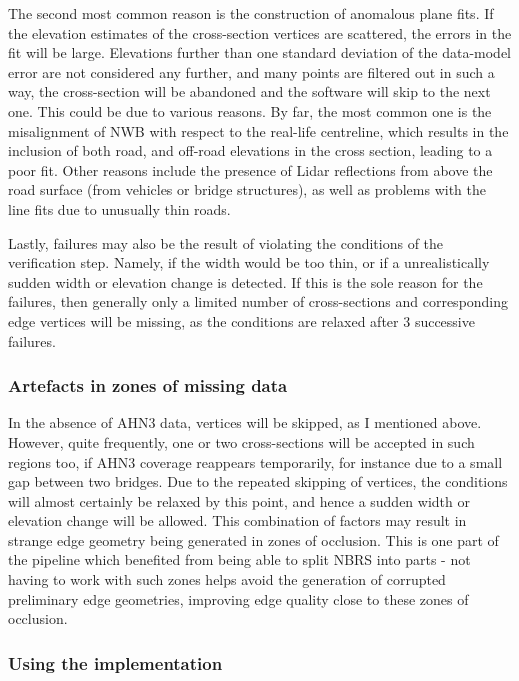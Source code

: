 The second most common reason is the construction of anomalous plane fits. If the elevation estimates of the cross-section vertices are scattered, the errors in the fit will be large. Elevations further than one standard deviation of the data-model error are not considered any further, and many points are filtered out in such a way, the cross-section will be abandoned and the software will skip to the next one. This could be due to various reasons. By far, the most common one is the misalignment of NWB with respect to the real-life centreline, which results in the inclusion of both road, and off-road elevations in the cross section, leading to a poor fit. Other reasons include the presence of Lidar reflections from above the road surface (from vehicles or bridge structures), as well as problems with the line fits due to unusually thin roads.

Lastly, failures may also be the result of violating the conditions of the verification step. Namely, if the width would be too thin, or if a unrealistically sudden width or elevation change is detected. If this is the sole reason for the failures, then generally only a limited number of cross-sections and corresponding edge vertices will be missing, as the conditions are relaxed after 3 successive failures.

\subsubsection{Artefacts in zones of missing data}

In the absence of AHN3 data, vertices will be skipped, as I mentioned above. However, quite frequently, one or two cross-sections will be accepted in such regions too, if AHN3 coverage reappears temporarily, for instance due to a small gap between two bridges. Due to the repeated skipping of vertices, the conditions will almost certainly be relaxed by this point, and hence a sudden width or elevation change will be allowed. This combination of factors may result in strange edge geometry being generated in zones of occlusion. This is one part of the pipeline which benefited from being able to split NBRS into parts - not having to work with such zones helps avoid the generation of corrupted preliminary edge geometries, improving edge quality close to these zones of occlusion.

\subsubsection{Using the implementation}

